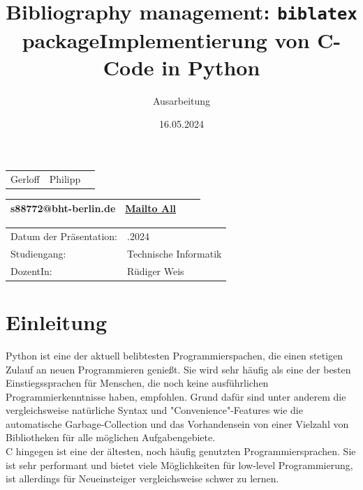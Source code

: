 \documentclass[a4paper, parskip=half]{scrartcl}
\title{Bibliography management: \texttt{biblatex} package}
\title{Implementierung von C-Code in Python}
\subtitle{Ausarbeitung}
\date{16.05.2024}
\newcommand{\ltab}{\raggedright\arraybackslash} %
\newcommand{\ctab}{\centering\arraybackslash} %
\newcommand{\rtab}{\raggedleft\arraybackslash} %
\begin{document}
\author{}
\maketitle
\begin{table}[H]
	\begin{tabularx}{\columnwidth}{X X X}
    \toprule
    \ltab Gerloff &\ctab Philipp &\rtab 928643\\ 
    \end{tabularx}
	\begin{tabularx}{\columnwidth}{c c c c}
    \toprule
	\small \ltab s88772@bht-berlin.de &
    \rtab \small\href{mailto:s88772bht-berlin.de,  s88328@bht-berlin.de, s87758@bht-berlin.de}{Mailto All} \\
	\bottomrule
	\end{tabularx}
    \begin{tabularx}{\columnwidth}{X X}
	\ltab Datum der Präsentation: & \rtab 16.05.2024\\ %
	\ltab Studiengang: & \rtab Technische Informatik\\	%
	\ltab DozentIn: & Rüdiger Weis \rtab \\
    \bottomrule
	\end{tabularx}
\end{table}

\newpage

\tableofcontents

\newpage


\section{Einleitung}

Python ist eine der aktuell belibtesten Programmierspachen, die einen stetigen Zulauf an neuen Programmieren genießt. Sie wird sehr häufig als eine der besten Einstiegssprachen für Menschen, die noch keine ausführlichen Programmierkenntnisse haben, empfohlen. Grund dafür sind unter anderem die vergleichsweise natürliche Syntax und "Convenience"-Features wie die automatische Garbage-Collection und das Vorhandensein von einer Vielzahl von Bibliotheken für alle möglichen Aufgabengebiete.\\
C hingegen ist eine der ältesten, noch häufig genutzten Programmiersprachen. Sie ist sehr performant und bietet viele Möglichkeiten für low-level Programmierung, ist allerdings für Neueinsteiger vergleichsweise schwer zu lernen.\\
\end{document}
